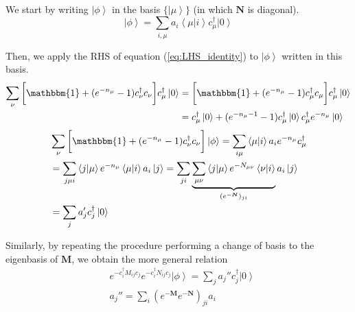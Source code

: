 We start by writing $\left| \phi \right\rangle$ in the basis $\{ \left| \mu \right\rangle \}$ (in which $\bm N$ is diagonal).
\begin{equation}
\left| \phi \right\rangle = \sum_{i,\mu} a_i \left\langle \mu | i \right\rangle c_\mu^\dagger \left| 0 \right\rangle
\end{equation}

Then, we apply the RHS of equation (\ref{eq:LHS_identity}) to $\left| \phi \right\rangle$ written in this basis.
\begin{equation}\label{eq:proofAuxIdentity}
\begin{split}
\sum_\nu \bigg[ \mathbbm{1} + ( e^{-n_\mu} - 1 ) c_\nu^\dagger c_\nu \bigg] c_\mu^\dagger \left| 0 \right\rangle 
&=\bigg[ \mathbbm{1} + ( e^{-n_\mu} - 1 ) c_\mu^\dagger c_\mu \bigg] c_\mu^\dagger \left| 0 \right\rangle \\
&= c_\mu^\dagger \left| 0 \right\rangle + (e^{-n_\mu - 1} - 1) c_\mu^\dagger \left| 0 \right\rangle c_\mu^\dagger e^{-n_\mu} \left| 0 \right\rangle
\end{split}
\end{equation}
\begin{equation}
\begin{split}
&\sum_\nu \bigg[ \mathbbm{1} + ( e^{-n_\mu} - 1 ) c_\nu^\dagger c_\nu \bigg] \left| \phi \right\rangle = \sum_{i\mu} \left\langle \mu | i \right\rangle a_i e^{-n_\mu} c_\mu^\dagger \\
&= \sum_{j\mu i} \left\langle j | \mu \right\rangle e^{-n_\mu} \left\langle \mu | i \right\rangle a_i \left| j \right\rangle = \sum_{j i} \underbrace{\sum_{\mu\nu} \left\langle j | \mu \right\rangle e^{-N_{\mu\nu}} \left\langle \nu | i \right\rangle}_{(e^{-\bm N})_{ji}} a_i \left| j \right\rangle \\
&= \sum_j a_j' c_j^\dagger \left| 0 \right\rangle
\end{split}
\end{equation}

Similarly, by repeating the procedure performing a change of basis to the eigenbasis of $\bm M$, we obtain the more general relation
\begin{equation}\label{eq:propagation_exps}
\begin{split}
&e^{-c_i^\dagger M_{ij} c_j} e^{-c_i^\dagger N_{ij} c_j} \left| \phi \right\rangle = \sum_j a_j'' c_j^\dagger \left| 0 \right\rangle \\
& a_j'' = \sum_i ( e^{-\bm M} e^{-\bm N} )_{ji} a_i
\end{split}
\end{equation}

